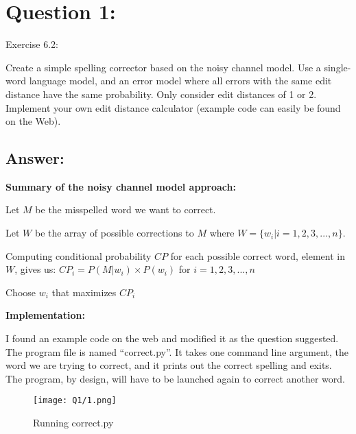 \section*{Question 1:}
Exercise 6.2: 

Create a simple spelling corrector based on the noisy channel model. Use a single-word language model, and an error model where all errors with the same edit distance have the same probability. Only consider edit distances of 1 or 2. Implement your own edit distance calculator (example code can easily be found on the Web).

\subsection*{Answer:}

\textbf{Summary of the noisy channel model approach:}

Let $M$ be the misspelled word we want to correct.

Let $W$ be the array of possible corrections to $M$ where $W = \{w_i | i = 1, 2, 3, ..., n\}$.

Computing conditional probability $CP$ for each possible correct word, element in $W$, gives us: $CP_i = P(M|w_i) \times P(w_i)$ for $i = 1, 2, 3, ..., n$

Choose $w_i$ that maximizes $CP_i$

\textbf{Implementation:}

I found an example code on the web and modified it as the question suggested. The program file is named ``correct.py''. It takes one command line argument, the word we are trying to correct, and it prints out the correct spelling and exits. The program, by design, will have to be launched again to correct another word. 



\begin{figure}[h]
\caption{Running correct.py}
\centering
\texttt{[image: Q1/1.png]}
\end{figure}



